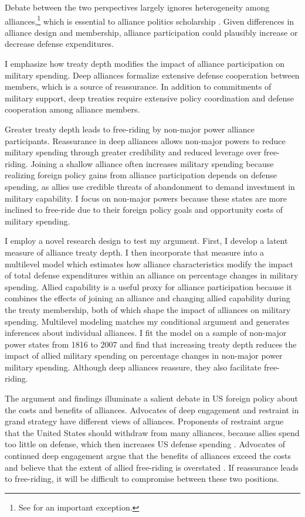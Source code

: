 \documentclass[12pt]{article}
\begin{document}
Debate between the two perspectives largely ignores heterogeneity among alliances,\footnote{See \citet{DigiuseppePoast2016} for an important exception.} which is essential to alliance politics scholarship \citep{Morrow1991, Leeds2003, LeedsAnac2005, Fordham2010, Mattes2012, Benson2012, Poast2013, Johnsonetal2015}.  
Given differences in alliance design and membership, alliance participation could plausibly increase or decrease defense expenditures. 


I emphasize how treaty depth modifies the impact of alliance participation on military spending. 
Deep alliances formalize extensive defense cooperation between members, which is a source of reassurance. 
In addition to commitments of military support, deep treaties require extensive policy coordination and defense cooperation among alliance members. 


Greater treaty depth leads to free-riding by non-major power alliance participants. 
Reassurance in deep alliances allows non-major powers to reduce military spending through greater credibility and reduced leverage over free-riding. 
Joining a shallow alliance often increases military spending because realizing foreign policy gains from alliance participation depends on defense spending, as allies use credible threats of abandonment to demand investment in military capability.
I focus on non-major powers because these states are more inclined to free-ride due to their foreign policy goals and opportunity costs of military spending.   
 

I employ a novel research design to test my argument.
First, I develop a latent measure of alliance treaty depth. 
I then incorporate that measure into a multilevel model which estimates how alliance characteristics modify the impact of total defense expenditures within an alliance on percentage changes in military spending.
Allied capability is a useful proxy for alliance participation because it combines the effects of joining an alliance and changing allied capability during the treaty membership, both of which shape the impact of alliances on military spending. 
Multilevel modeling matches my conditional argument and generates inferences about individual alliances. 
I fit the model on a sample of non-major power states from 1816 to 2007 and find that increasing treaty depth reduces the impact of allied military spending on percentage changes in non-major power military spending.
Although deep alliances reassure, they also facilitate free-riding. 


The argument and findings illuminate a salient debate in US foreign policy about the costs and benefits of alliances. 
Advocates of deep engagement \citep{Brooksetal2013} and restraint \citep{Posen2014} in grand strategy have different views of alliances. 
Proponents of restraint argue that the United States should withdraw from many alliances, because allies spend too little on defense, which then increases US defense spending \citep{Preble2009}.
Advocates of continued deep engagement argue that the benefits of alliances exceed the costs and believe that the extent of allied free-riding is overstated \citep{BrandsFeaver2017}. 
If reassurance leads to free-riding, it will be difficult to compromise between these two positions.  
\end{document}
